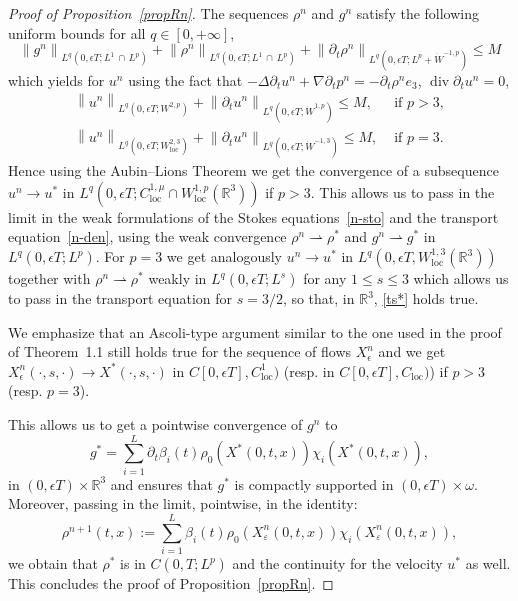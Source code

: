 \documentclass[AHL,Unicode,longabstracts,published]{cedram}
\newcommand{\R}{\mathbb{R}}
\renewcommand{\leq}{\leqslant}
\renewcommand{\div}{\operatorname{div}}
\newcommand{\loc}{\operatorname{loc}}
\newcommand{\eps}{\epsilon}
\begin{document}
\begin{proof}[Proof of Proposition~\ref{propRn}]
The sequences $\rho^n$ and $g^n$ satisfy the following uniform bounds for all $q\in [0,+\infty]$,
\[
\left\|g^n\right\|_{L^q\left(0,\eps T;L^1\,\cap\,L^p\right)}+\left\|\rho^n\right\|_{L^q\left(0,\eps T;L^1\,\cap\,L^p\right)}+ \left\|\partial_t\rho^n\right\|_{L^q\left(0,\eps T;L^p+\dot{W}^{-1,p}\right)} \leq M
\]
which yields for $u^n$ using the fact that $-\Delta \partial_t u^n+ \nabla \partial_t p^n= - \partial_t \rho^n e_3$, $\div \partial_t u^n=0$,
\begin{align*}
\left\|u^n\right\|_{L^q\left(0,\eps T;W^{2,p}\right)}+ \left\|\partial_t u^n\right\|_{L^q\left(0,\eps T;\dot{W}^{1,p}\right)} \leq M, & \text{ if } p>3,\\
\left\|u^n\right\|_{L^q\left(0,\eps T;W_{\loc}^{2,3}\right)} + \left\|\partial_t u^n\right\|_{L^q\left(0,\eps T;\dot{W}^{-1,3}\right)} \leq M, & \text{ if } p=3.
\end{align*}
Hence using the Aubin--Lions Theorem we get the convergence of a subsequence $u^n \to u^* $ in $L^q(0,\eps T; C^{1,\mu}_{\loc}\cap W^{1,p}_{\loc} (\R^3))$ if $p>3$. This allows us to pass in the limit in the weak formulations of the Stokes equations~\eqref{n-sto} and the transport equation~\eqref{n-den}, using the weak convergence $\rho^n \rightharpoonup \rho^* $ and $g^n \rightharpoonup g^* $ in $L^q(0,\eps T;L^p) $. For $p=3$ we get analogously $u^n \to u^* $ in $L^q(0,\eps T,W^{1,3}_{\loc}(\R^3)) $ together with $\rho^n \rightharpoonup \rho^* $ weakly in $L^q(0,\eps T;L^s) $ for any $1 \leq s \leq 3$ which allows us to pass in the transport equation for $s=3/2$, so that, in $\R^3$, \eqref{ts*} holds true.

We emphasize that an Ascoli-type argument similar to the one used in the proof of Theorem~1.1 still holds true for the sequence of flows $X_\epsilon^n $ and we get $X^n_\epsilon(\cdot,s,\cdot) \to X^* (\cdot,s,\cdot) $ in $ C[0,\eps T], C^1_{\loc}) $ (resp. in $ C[0,\eps T], C_{\loc}) $) if $p>3$ (resp. $p=3$).

This allows us to get a pointwise convergence of $g^n$ to
\[
g^* =\underset{i=1}{\overset{L}{\sum}} \partial_t \beta_i(t) \rho_0(X^*(0,t,x))\chi_i(X^*(0,t,x)),
\]
in $(0,\eps T)\times \R^3$ and ensures that $g^*$ is compactly supported in $(0,\eps T)\times \omega$. Moreover, passing in the limit, pointwise, in the identity:
\[
\rho^{n+1}(t,x):= \underset{i=1}{\overset{L}{\sum}}\beta_i(t) \rho_0(X^n_\varepsilon(0,t,x)) \chi_i(X^n_\varepsilon(0,t,x)),
\]
we obtain that $\rho^* $ is in $ C(0,T; L^p) $ and the continuity for the velocity $u^*$ as well. This concludes the proof of Proposition~\ref{propRn}.
\end{proof}
\end{document}
